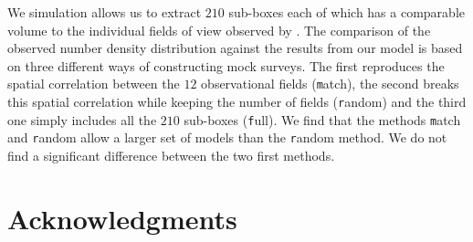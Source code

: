 \documentclass[usenatbib]{mn2e}
\begin{document}
We simulation allows us to extract $210$ sub-boxes each of which has a
comparable volume to the individual fields of view observed by
\cite{Yamada2012}. The comparison of the observed number density
distribution against the results from our model is based on three
different ways of constructing mock surveys. The first reproduces the
spatial correlation between the $12$ observational fields ({\texttt
  match}), the second breaks this spatial correlation while keeping
the number of fields ({\texttt random}) and the third one simply
includes all the $210$ sub-boxes ({\texttt full}). We find that the
methods {\texttt match} and {\texttt random} allow a larger set of
models than the {{\texttt random}} method. We do not find a
significant difference between the two first methods. 






\section*{Acknowledgments} 
\end{document}
